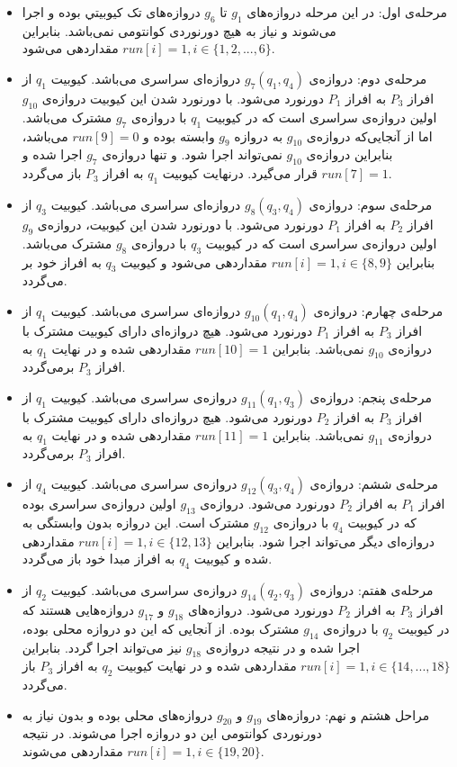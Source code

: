 \begin{itemize}
\item
مرحله‌ی اول: در این مرحله دروازه‌های $g_1 $ تا $g_6 $ دروازه‌های تک کیوبیتي بوده و اجرا می‌شوند و نیاز به هیچ دورنوردی کوانتومی نمی‌باشد. بنابراین $run[i]=1, i \in \{1,2,...,6\} $ مقداردهی می‌شود.
\item
مرحله‌ی دوم: دروازه‌ی $g_7(q_1,q_4)$ دروازه‌ای سراسری می‌باشد. کیوبیت $q_1 $ از افراز $P_3 $ به افراز $P_1 $ دورنورد می‌شود. با  دورنورد شدن این کیوبیت دروازه‌ی $g_{10}$ اولین دروازه‌ی سراسری است که در کیوبیت $q_1 $ با دروازه‌ی $g_{7}$ مشترک می‌باشد. اما از آنجایی‌که دروازه‌ی $g_{10}$ به دروازه‌ $g_{9}$ وابسته بوده و  $run[9]=0$ می‌باشد، بنابراین دروازه‌ی $g_{10}$ نمی‌تواند اجرا شود. و تنها دروازه‌ی $g_7$ اجرا شده و  $run[7]=1$ قرار می‌گیرد. درنهایت کیوبیت $q_1 $ به افراز $P_3 $ باز می‌گردد.

\item
مرحله‌ی سوم: دروازه‌ی $g_8(q_3,q_4)$ دروازه‌ای سراسری می‌باشد. کیوبیت $q_3 $ از افراز $P_2 $ به افراز $P_1 $ دورنورد می‌شود. با دورنورد شدن این کیوبیت، دروازه‌ی $g_{9}$ اولین دروازه‌ی سراسری است که در کیوبیت $q_3 $ با دروازه‌ی $g_{8}$ مشترک می‌باشد. بنابراین $run[i]=1,i \in\{8,9\}$ مقداردهی می‌شود و کیوبیت $q_3 $ به افراز خود بر می‌گردد.
\item
مرحله‌ی چهارم: دروازه‌ی $g_{10}(q_1,q_4)$ دروازه‌ای سراسری می‌باشد. کیوبیت $q_1 $ از افراز $P_3 $ به افراز $P_1 $ دورنورد می‌شود. هیچ دروازه‌ای دارای کیوبیت مشترک با دروازه‌ی $g_{10}$ نمی‌باشد. بنابراین $run[10]=1$ مقداردهی شده و در نهایت  $q_1$ به افراز  $P_3$ برمی‌گردد.
\item
مرحله‌‌ی پنجم: دروازه‌ی  $g_{11}(q_1,q_3)$ دروازه‌ی سراسری می‌باشد. کیوبیت $q_1 $ از افراز $P_3 $ به افراز $P_2 $ دورنورد می‌شود. هیچ دروازه‌ای دارای کیوبیت مشترک با دروازه‌ی $g_{11}$ نمی‌باشد. بنابراین $run[11]=1$ مقداردهی شده و در نهایت  $q_1$ به افراز  $P_3$ برمی‌گردد.
\item
مرحله‌ی ششم: دروازه‌ی  $g_{12}(q_3,q_4)$ دروازه‌ی سراسری می‌باشد. کیوبیت $q_4 $ از افراز $P_1 $ به افراز $P_2 $ دورنورد می‌شود. دروازه‌ی $g_{13}$ اولین دروازه‌ی سراسری بوده که در کیوبیت  $q_4 $ با دروازه‌ی $g_{12}$ مشترک است. این دروازه‌ بدون وابستگی به دروازه‌ای دیگر می‌تواند اجرا شود. بنابراین $run[i]=1,i \in \{12,13\}$ مقداردهی شده و  کیوبیت  $q_4$ به افراز مبدا خود باز می‌گردد.
\item
مرحله‌ی هفتم: دروازه‌ی  $g_{14}(q_2,q_3)$ دروازه‌ی سراسری می‌باشد. کیوبیت $q_2 $ از افراز $P_3 $ به افراز $P_2 $ دورنورد می‌شود. دروازه‌‌های $g_{18}$ و $g_{17}$ دروازه‌هایی هستند که در کیوبیت $q_2$ با دروازه‌ی $g_{14}$ مشترک بوده. از آنجایی که این دو دروازه محلی بوده، اجرا شده و در نتیجه دروازه‌ی $g_{18}$ نیز می‌تواند اجرا گردد. بنابراین $run[i]=1, i \in \{14,...,18\}$ مقداردهی شده و در نهایت کیوبیت  $q_2$ به افراز $P_3$ باز می‌گردد.
\item
مراحل هشتم و نهم: دروازه‌های $g_{19}$ و $g_{20}$ دروازه‌های محلی بوده و بدون نیاز به دورنوردی کوانتومی این دو دروازه اجرا می‌شوند. در نتیجه $run[i]=1,i \in \{19,20\}$ مقداردهی می‌شوند.


\end{itemize}
